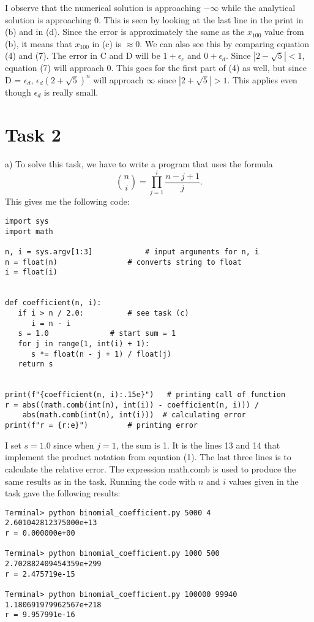 \documentclass[11pt,
				a4paper,
				article,
				oneside,
				oldfontcommands]{memoir}
\begin{document}
I observe that the numerical solution is approaching $-\infty$ while the analytical solution is approaching 0. This is seen by looking at the last line in the print in (b) and in (d). Since the error is approximately the same as the $x_{100}$ value from (b), it means that $x_{100}$ in (c) is $\approx 0$. We can also see this by comparing equation (4) and (7). The error in C and D will be $1 + \epsilon_{c}$ and $0 + \epsilon_{d}$. Since $|2-\sqrt{5}|<1$, equation (7) will approach 0. This goes for the first part of (4) as well, but since D = $\epsilon_{d}$, $\epsilon_{d} (2+\sqrt{5})^n$ will approach $\infty$ since $|2+\sqrt{5}|>1$. This applies even though $\epsilon_{d}$ is really small. 

\pagebreak

\section{Task 2}
a) To solve this task, we have to write a program that uses the formula
\begin{equation}
	\binom{n}{i}=\prod_{j=1}^i \frac{n-j+1}{j}.
\end{equation}
This gives me the following code:
\begin{lstlisting}
import sys
import math

n, i = sys.argv[1:3]			# input arguments for n, i
n = float(n)				# converts string to float
i = float(i)


def coefficient(n, i):
   if i > n / 2.0:			# see task (c)
	  i = n - i
   s = 1.0 				# start sum = 1
   for j in range(1, int(i) + 1):
	  s *= float(n - j + 1) / float(j)
   return s


print(f"{coefficient(n, i):.15e}") 	 # printing call of function
r = abs((math.comb(int(n), int(i)) - coefficient(n, i))) /
    abs(math.comb(int(n), int(i)))	# calculating error
print(f"r = {r:e}")			# printing error
\end{lstlisting}

I set $s = 1.0$ since when $j = 1$, the sum is 1. It is the lines 13 and 14 that implement the product notation from equation (1). The last three lines is to calculate the relative error. The expression math.comb is used to produce the same results as in the task. Running the code with $n$ and $i$ values given in the task gave the following results:

\begin{lstlisting}
Terminal> python binomial_coefficient.py 5000 4
2.601042812375000e+13
r = 0.000000e+00

Terminal> python binomial_coefficient.py 1000 500
2.702882409454359e+299
r = 2.475719e-15

Terminal> python binomial_coefficient.py 100000 99940
1.180691979962567e+218
r = 9.957991e-16
\end{lstlisting}
\end{document}
